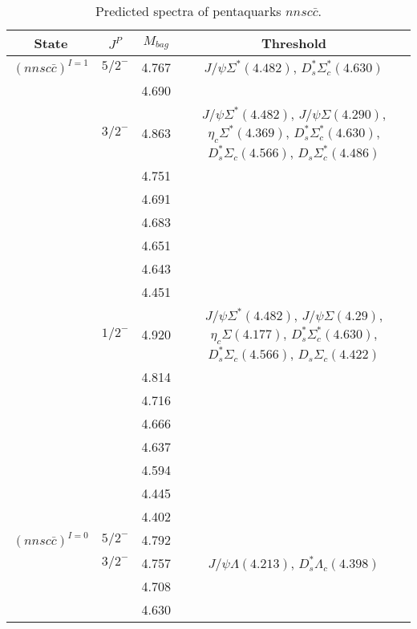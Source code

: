 \documentclass[prd,twocolumn,floatfix,nofootinbib]{revtex4}
\begin{document}
\renewcommand{\tabcolsep}{0.2cm}
\renewcommand{\arraystretch}{1.2}
\begin{table*}[!htbp]
    \caption{Predicted spectra of pentaquarks $nnsc\bar{c}$.}
    \begin{tabular}{cccc}
        \hline\hline
        {\rm State} &$J^{P}$ &$M_{bag}$ &Threshold \\ \hline
        ${(nnsc\bar{c})}^{I=1}$
            &${5/2}^{-}$    &4.767 &$J/\psi\Sigma^{\ast}(4.482)$, $D_{s}^{\ast}\Sigma_{c}^{\ast}(4.630)$ \\
            &               &4.690 & \\
            &${3/2}^{-}$    &4.863 &$J/\psi\Sigma^{\ast}(4.482)$, $J/\psi\Sigma(4.290)$, $\eta_{c}\Sigma^{\ast}(4.369)$, $D_{s}^{\ast}\Sigma_{c}^{\ast}(4.630)$, $D_{s}^{\ast}\Sigma_{c}(4.566)$, $D_{s}\Sigma_{c}^{\ast}(4.486)$ \\
            &               &4.751 & \\
            &               &4.691 & \\
            &               &4.683 & \\
            &               &4.651 & \\
            &               &4.643 & \\
            &               &4.451 & \\
            &${1/2}^{-}$    &4.920 &$J/\psi\Sigma^{\ast}(4.482)$, $J/\psi\Sigma(4.29)$, $\eta_{c}\Sigma(4.177)$, $D_{s}^{\ast}\Sigma_{c}^{\ast}(4.630)$, $D_{s}^{\ast}\Sigma_{c}(4.566)$, $D_{s}\Sigma_{c}(4.422)$ \\
            &               &4.814 & \\
            &               &4.716 & \\
            &               &4.666 & \\
            &               &4.637 & \\
            &               &4.594 & \\
            &               &4.445 & \\
            &               &4.402 & \\
        ${(nnsc\bar{c})}^{I=0}$
            &${5/2}^{-}$    &4.792 & \\
            &${3/2}^{-}$    &4.757 &$J/\psi\Lambda(4.213)$, $D_{s}^{\ast}\Lambda_{c}(4.398)$ \\
            &               &4.708 & \\
            &               &4.630 & \\

\end{tabular}
\end{table*}
\end{document}
